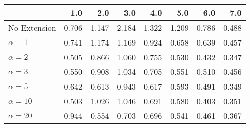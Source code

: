 \begin{tabular}{lrrrrrrr}
\toprule
{} &   1.0 &   2.0 &   3.0 &   4.0 &   5.0 &   6.0 &   7.0 \\
\midrule
No Extension  & 0.706 & 1.147 & 2.184 & 1.322 & 1.209 & 0.786 & 0.488 \\
$\alpha = 1$  & 0.741 & 1.174 & 1.169 & 0.924 & 0.658 & 0.639 & 0.457 \\
$\alpha = 2$  & 0.505 & 0.866 & 1.060 & 0.755 & 0.530 & 0.432 & 0.347 \\
$\alpha = 3$  & 0.550 & 0.908 & 1.034 & 0.705 & 0.551 & 0.510 & 0.456 \\
$\alpha = 5$  & 0.642 & 0.613 & 0.943 & 0.617 & 0.593 & 0.491 & 0.349 \\
$\alpha = 10$ & 0.503 & 1.026 & 1.046 & 0.691 & 0.580 & 0.403 & 0.351 \\
$\alpha = 20$ & 0.944 & 0.554 & 0.703 & 0.696 & 0.541 & 0.461 & 0.367 \\
\bottomrule
\end{tabular}
